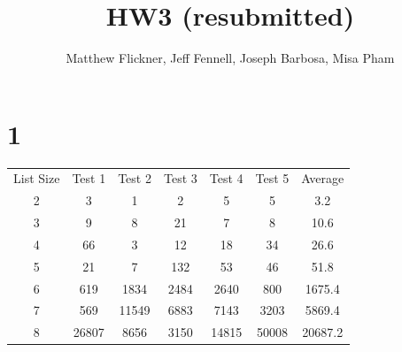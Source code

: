 \documentclass[a4paper]{article}
\title{HW3 (resubmitted)}
\author{Matthew Flickner, Jeff Fennell, Joseph Barbosa, Misa Pham}
\begin{document}
\maketitle

\section*{1}

 
 
\begin{table}[h]
\begin{tabular}{ccccccc}
List Size              & Test 1                     & Test 2                     & Test 3                    & Test 4                     & Test 5                     & Average                      \\ \cline{2-7} 
\multicolumn{1}{c|}{2} & \multicolumn{1}{c|}{3}     & \multicolumn{1}{c|}{1}     & \multicolumn{1}{c|}{2}    & \multicolumn{1}{c|}{5}     & \multicolumn{1}{c|}{5}     & \multicolumn{1}{c|}{3.2}     \\ \cline{2-7} 
\multicolumn{1}{c|}{3} & \multicolumn{1}{c|}{9}     & \multicolumn{1}{c|}{8}     & \multicolumn{1}{c|}{21}   & \multicolumn{1}{c|}{7}     & \multicolumn{1}{c|}{8}     & \multicolumn{1}{c|}{10.6}    \\ \cline{2-7} 
\multicolumn{1}{c|}{4} & \multicolumn{1}{c|}{66}    & \multicolumn{1}{c|}{3}     & \multicolumn{1}{c|}{12}   & \multicolumn{1}{c|}{18}    & \multicolumn{1}{c|}{34}    & \multicolumn{1}{c|}{26.6}    \\ \cline{2-7} 
\multicolumn{1}{c|}{5} & \multicolumn{1}{c|}{21}    & \multicolumn{1}{c|}{7}     & \multicolumn{1}{c|}{132}  & \multicolumn{1}{c|}{53}    & \multicolumn{1}{c|}{46}    & \multicolumn{1}{c|}{51.8}    \\ \cline{2-7} 
\multicolumn{1}{c|}{6} & \multicolumn{1}{c|}{619}   & \multicolumn{1}{c|}{1834}  & \multicolumn{1}{c|}{2484} & \multicolumn{1}{c|}{2640}  & \multicolumn{1}{c|}{800}   & \multicolumn{1}{c|}{1675.4}  \\ \cline{2-7} 
\multicolumn{1}{c|}{7} & \multicolumn{1}{c|}{569}   & \multicolumn{1}{c|}{11549} & \multicolumn{1}{c|}{6883} & \multicolumn{1}{c|}{7143}  & \multicolumn{1}{c|}{3203}  & \multicolumn{1}{c|}{5869.4}  \\ \cline{2-7} 
\multicolumn{1}{c|}{8} & \multicolumn{1}{c|}{26807} & \multicolumn{1}{c|}{8656}  & \multicolumn{1}{c|}{3150} & \multicolumn{1}{c|}{14815} & \multicolumn{1}{c|}{50008} & \multicolumn{1}{c|}{20687.2} \\ \cline{2-7} 
\end{tabular}
\end{table}
\end{document}
